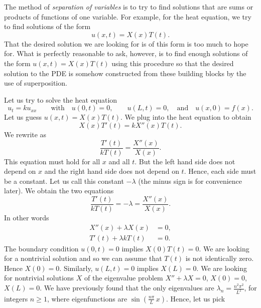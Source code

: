 The method of
\emph{separation of variables} is to
try to find solutions that are sums or products of functions of one variable.
For example, for the heat equation, we try to find solutions of the form
\begin{equation*}
u(x,t) = X(x)T(t) .
\end{equation*}
That the desired solution we are looking for is of this form is too much to
hope for.  What is perfectly reasonable to ask, however, is to find
enough  solutions of the form
$u(x,t) = X(x)T(t)$ using this procedure
so that the desired solution to the PDE is somehow constructed from these
building blocks by the use of superposition.

Let us try to solve the heat equation
\begin{equation*}
u_t = k u_{xx}
\qquad \text{with} \quad
u(0,t) = 0 ,\quad \quad u(L,t) = 0,
\quad \text{and} \quad u(x,0) = f(x) .
\end{equation*}
Let us guess $u(x,t) = X(x)T(t)$.  We plug into the heat equation to
obtain
\begin{equation*}
X(x)T'(t) = k X''(x)T(t) .
\end{equation*}
We rewrite as
\begin{equation*}
\frac{T'(t)}{k T(t)} =
\frac{X''(x)}{X(x)} .
\end{equation*}
This equation must hold for all $x$ and all $t$.  But the left
hand side does not depend on $x$ and the right hand side does not
depend on $t$.  Hence, each side must be a constant.  Let us call this
constant $-\lambda$ (the minus sign is for convenience later).
We obtain the two equations
\begin{equation*}
\frac{T'(t)}{k T(t)} = -\lambda =
\frac{X''(x)}{X(x)} .
\end{equation*}
In other words
\begin{align*}
X''(x) + \lambda X(x) &= 0 , \\
T'(t) + \lambda k T(t) &= 0 .
\end{align*}
The boundary condition $u(0,t) = 0$ implies $X(0)T(t) = 0$.  We are looking
for a nontrivial solution and so we can assume that $T(t)$ is not identically
zero.  Hence $X(0) = 0$.  Similarly, $u(L,t) = 0$ implies $X(L) = 0$.  We
are looking for nontrivial solutions $X$ of the eigenvalue problem
$X'' + \lambda X = 0$, $X(0) = 0$, $X(L) = 0$.  We have previously found that
the only eigenvalues are $\lambda_n = \frac{n^2 \pi^2}{L^2}$, for integers
$n \geq 1$,
where eigenfunctions are $\sin \left(\frac{n \pi}{L} \, x\right)$.  Hence, let us pick
